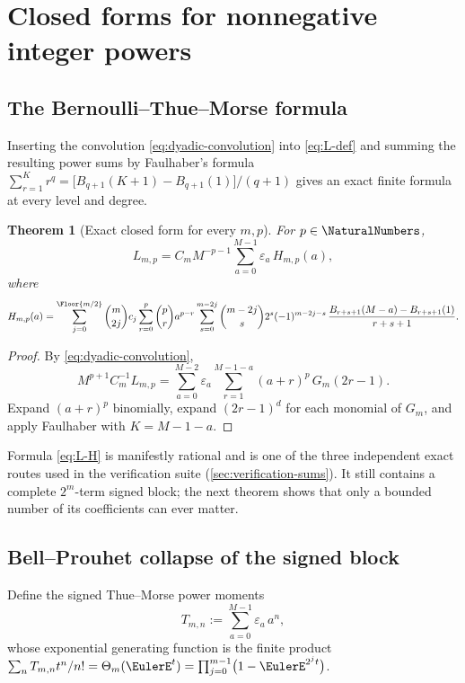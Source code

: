 \documentclass[11pt,oneside]{article}
\numberwithin{equation}{section}
\newtheorem{theorem}{Theorem}[section]
\theoremstyle{definition}
\theoremstyle{remark}
\newcommand{\eps}{\varepsilon}
\newcommand{\ThetaTM}{\Theta}
\begin{document}
\section{Closed forms for nonnegative integer powers}
\label{sec:integer}

\subsection{The Bernoulli--Thue--Morse formula}

Inserting the convolution \eqref{eq:dyadic-convolution} into
\eqref{eq:L-def} and summing the resulting power sums by Faulhaber's
formula
$\sum_{r=1}^{K}r^{q}=\bigl[B_{q+1}(K+1)-B_{q+1}(1)\bigr]/(q+1)$
gives an exact finite formula at every level and degree.

\begin{theorem}[Exact closed form for every $m,p$]
\label{thm:bernoulli-TM}
For $p\in\NaturalNumbers$,
\begin{equation}
 L_{m,p}=C_mM^{-p-1}
 \sum_{a=0}^{M-1}\eps_a\,H_{m,p}(a),
 \label{eq:L-H}
\end{equation}
where
\begin{equation}
 H_{m,p}(a)
 =\sum_{j=0}^{\Floor{m/2}}\binom m{2j}c_j
 \sum_{r=0}^{p}\binom pr a^{p-r}
 \sum_{s=0}^{m-2j}\binom{m-2j}{s}2^{s}(-1)^{m-2j-s}\,
 \frac{B_{r+s+1}(M-a)-B_{r+s+1}(1)}{r+s+1}.
 \label{eq:Hnp}
\end{equation}
\end{theorem}

\begin{proof}
By \eqref{eq:dyadic-convolution},
\[
 M^{p+1}C_m^{-1}L_{m,p}
 =\sum_{a=0}^{M-2}\eps_a
 \sum_{r=1}^{M-1-a}(a+r)^{p}\,G_m(2r-1).
\]
Expand $(a+r)^p$ binomially, expand $(2r-1)^{d}$ for each monomial of
$G_m$, and apply Faulhaber with $K=M-1-a$.
\end{proof}

Formula \eqref{eq:L-H} is manifestly rational and is one of the three
independent exact routes used in the verification suite
(\cref{sec:verification-sums}).  It still contains a complete
$2^{m}$-term signed block; the next theorem shows that only a bounded
number of its coefficients can ever matter.

\subsection{Bell--Prouhet collapse of the signed block}

Define the signed Thue--Morse power moments
\begin{equation}
 T_{m,n}:=\sum_{a=0}^{M-1}\eps_a\,a^{n},
 \label{eq:TNm}
\end{equation}
whose exponential generating function is the finite product
$\sum_{n}T_{m,n}t^{n}/n!=\ThetaTM_m(\EulerE^{t})
=\prod_{j=0}^{m-1}\bigl(1-\EulerE^{2^{j}t}\bigr)$.
\end{document}
